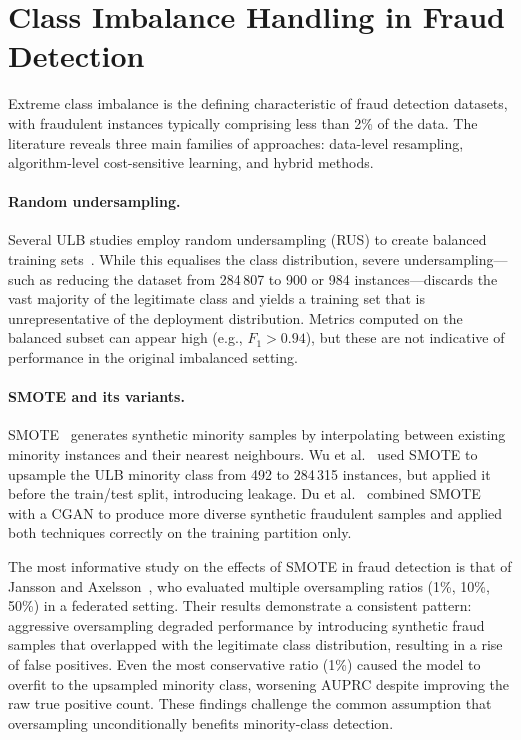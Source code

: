 \section{Class Imbalance Handling in Fraud Detection}
\label{sec:rw_imbalance}

Extreme class imbalance is the defining characteristic of fraud detection datasets, with fraudulent instances typically comprising less than 2\% of the data. The literature reveals three main families of approaches: data-level resampling, algorithm-level cost-sensitive learning, and hybrid methods.

\paragraph{Random undersampling.}
Several ULB studies employ random undersampling (RUS) to create balanced training sets~\cite{georgieva2019neural, mosa2024ccfd}. While this equalises the class distribution, severe undersampling---such as reducing the dataset from 284\,807 to 900 or 984 instances---discards the vast majority of the legitimate class and yields a training set that is unrepresentative of the deployment distribution. Metrics computed on the balanced subset can appear high (e.g., $F_1 > 0.94$), but these are not indicative of performance in the original imbalanced setting.

\paragraph{SMOTE and its variants.}
SMOTE~\cite{chawla2002smote} generates synthetic minority samples by interpolating between existing minority instances and their nearest neighbours. Wu et al.~\cite{wu2025ccnn} used SMOTE to upsample the ULB minority class from 492 to 284\,315 instances, but applied it before the train/test split, introducing leakage. Du et al.~\cite{du2024novel} combined SMOTE with a CGAN to produce more diverse synthetic fraudulent samples and applied both techniques correctly on the training partition only.

The most informative study on the effects of SMOTE in fraud detection is that of Jansson and Axelsson~\cite{jansson2020federated}, who evaluated multiple oversampling ratios (1\%, 10\%, 50\%) in a federated setting. Their results demonstrate a consistent pattern: aggressive oversampling degraded performance by introducing synthetic fraud samples that overlapped with the legitimate class distribution, resulting in a rise of false positives. Even the most conservative ratio (1\%) caused the model to overfit to the upsampled minority class, worsening AUPRC despite improving the raw true positive count. These findings challenge the common assumption that oversampling unconditionally benefits minority-class detection.

